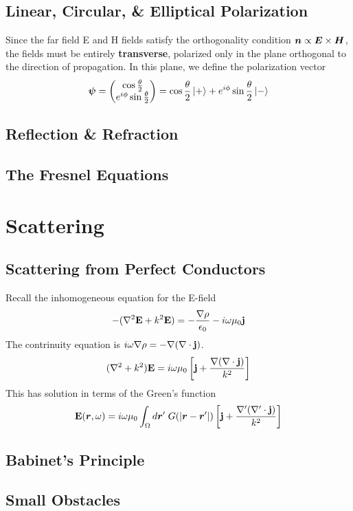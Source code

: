 \documentclass[twocolumn]{gwclass}
\newcommand{\bt}[1]{\text{\textbf{#1}}}
\begin{document}
	\subsection{Linear, Circular, \& Elliptical Polarization}
	Since the far field E and H fields satisfy the orthogonality condition $\boldsymbol{n} \propto \boldsymbol{E}\times\boldsymbol{H}$, the fields must be entirely \textbf{transverse}, polarized only in the plane orthogonal to the direction of propagation. In this plane, we define the polarization vector
	$$ \boldsymbol{\psi} = \begin{pmatrix}
		\cos\frac{\theta}{2} \\
		e^{i\phi}\sin\frac{\theta}{2}
	\end{pmatrix} = \cos\frac{\theta}{2}\ket{+} + e^{i\phi}\sin\frac{\theta}{2}\ket{-} $$
	
	\subsection{Reflection \& Refraction}
	\subsection{The Fresnel Equations}
	
	\section{Scattering}
	\subsection{Scattering from Perfect Conductors}
	Recall the inhomogeneous equation for the E-field
	$$ -(\nabla^2\bt E + k^2 \bt{E}) = -\frac{\nabla\rho}{\epsilon_0} - i\omega \mu_0 \bt j  $$
	The contrinuity equation is $i\omega\nabla\rho = -\nabla(\nabla\cdot\bt{j})$.
	$$	(\nabla^2 + k^2) \bt{E} = i\omega \mu_0 \left[ \bt{j} +  \frac{\nabla(\nabla\cdot\bt{j})}{k^2} \right]$$
	This has solution in terms of the Green's function
	$$ \bt{E}(\*r,\omega) = i\omega\mu_0 \int_\Omega d\*r'\;G(|\*r-\*r'|) \left[ \bt{j} +  \frac{\nabla'(\nabla'\cdot\bt{j} )}{k^2} \right] $$

	\subsection{Babinet's Principle}
	\subsection{Small Obstacles}
\end{document}
